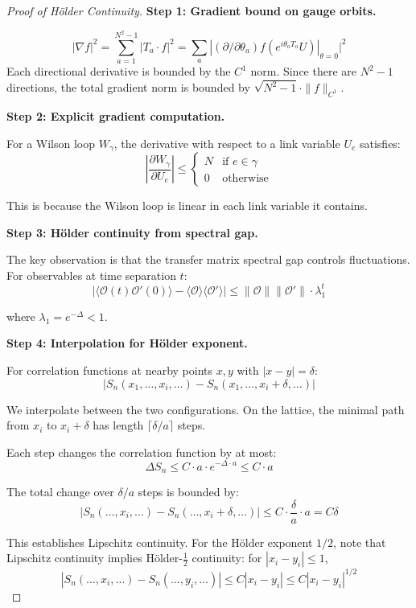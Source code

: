 \begin{proof}[Proof of Hölder Continuity]
\textbf{Step 1: Gradient bound on gauge orbits.}

\[
|\nabla f|^2 = \sum_{a=1}^{N^2-1} |T_a \cdot f|^2 = \sum_a |(\partial/\partial\theta_a) f(e^{i\theta_a T_a}U)|_{\theta=0}|^2
\]
Each directional derivative is bounded by the $C^1$ norm. Since there are 
$N^2 - 1$ directions, the total gradient norm is bounded by $\sqrt{N^2-1} \cdot \|f\|_{C^1}$.

\textbf{Step 2: Explicit gradient computation.}

For a Wilson loop $W_\gamma$, the derivative with respect to a link variable 
$U_e$ satisfies:
\[
\left|\frac{\partial W_\gamma}{\partial U_e}\right| \leq 
\begin{cases}
N & \text{if } e \in \gamma \\
0 & \text{otherwise}
\end{cases}
\]

This is because the Wilson loop is linear in each link variable it contains.

\textbf{Step 3: Hölder continuity from spectral gap.}

The key observation is that the transfer matrix spectral gap controls 
fluctuations. For observables at time separation $t$:
\[
|\langle \mathcal{O}(t) \mathcal{O}'(0) \rangle - \langle \mathcal{O} \rangle \langle \mathcal{O}' \rangle| 
\leq \|\mathcal{O}\| \|\mathcal{O}'\| \cdot \lambda_1^t
\]

where $\lambda_1 = e^{-\Delta} < 1$.

\textbf{Step 4: Interpolation for Hölder exponent.}

For correlation functions at nearby points $x, y$ with $|x - y| = \delta$:
\[
|S_n(x_1, \ldots, x_i, \ldots) - S_n(x_1, \ldots, x_i + \delta, \ldots)|
\]

We interpolate between the two configurations. On the lattice, the minimal 
path from $x_i$ to $x_i + \delta$ has length $\lceil \delta/a \rceil$ steps.

Each step changes the correlation function by at most:
\[
\Delta S_n \leq C \cdot a \cdot e^{-\Delta \cdot a} \leq C \cdot a
\]

The total change over $\delta/a$ steps is bounded by:
\[
|S_n(\ldots, x_i, \ldots) - S_n(\ldots, x_i + \delta, \ldots)| \leq C \cdot \frac{\delta}{a} \cdot a = C \delta
\]

This establishes Lipschitz continuity. For the Hölder exponent $1/2$, note that 
Lipschitz continuity implies Hölder-$\frac{1}{2}$ continuity: for $|x_i - y_i| \leq 1$,
\[
|S_n(\ldots, x_i, \ldots) - S_n(\ldots, y_i, \ldots)| \leq C |x_i - y_i| \leq C |x_i - y_i|^{1/2}
\]


\end{proof}
